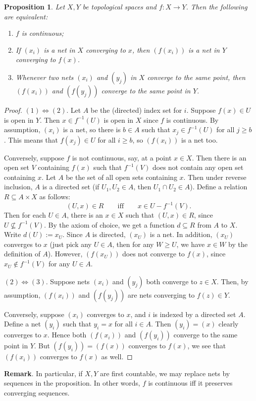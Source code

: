 \documentclass[12pt]{article}
\newtheorem{prop}{Proposition}
\begin{document}
\begin{prop}  Let $X,Y$ be topological spaces and $f:X\to Y$.  Then the following are equivalent: 
\begin{enumerate}
\item $f$ is continuous;
\item If $(x_i)$ is a net in $X$ converging to $x$, then $(f(x_i))$ is a net in $Y$ converging to $f(x)$.
\item Whenever two nets $(x_i)$ and $(y_j)$ in $X$ converge to the same point, then $(f(x_i))$ and $(f(y_j))$
converge to the same point in $Y$.
\end{enumerate}
\end{prop}
\begin{proof}
$(1)\Leftrightarrow (2)$.  Let $A$ be the (directed) index set for $i$.  Suppose $f(x)\in U$ is open in $Y$.  Then $x\in f^{-1}(U)$ is open in $X$ since $f$ is continuous.  By assumption, $(x_i)$ is a net, so there is $b \in A$ such that $x_j \in f^{-1}(U)$ for all $j\ge b$.  This means that $f(x_j)\in U$ for all $i\ge b$, so $(f(x_i))$ is a net too.

Conversely, suppose $f$ is not continuous, say, at a point $x\in X$.  Then there is an open set $V$ containing $f(x)$ such that $f^{-1}(V)$ does not contain any open set containing $x$.  Let $A$ be the set of all open sets containing $x$.  Then under reverse inclusion, $A$ is a directed set (if $U_1,U_2\in A$, then $U_1\cap U_2\in A$).  Define a relation $R\subseteq A\times X$ as follows: $$(U,x)\in R \qquad\mbox{iff}\qquad x\in U-f^{-1}(V).$$  Then for each $U\in A$, there is an $x\in X$ such that $(U,x)\in R$, since $U\not\subseteq f^{-1}(V)$.  By the axiom of choice, we get a function $d\subseteq R$ from $A$ to $X$.  Write $d(U):=x_U$.  Since $A$ is directed, $(x_U)$ is a net.  In addition, $(x_U)$ converges to $x$ (just pick any $U\in A$, then for any $W\ge U$, we have $x \in W$ by the definition of $A$).  However, $(f(x_U))$ does not converge to $f(x)$, since $x_U\notin f^{-1}(V)$ for any $U\in A$.

$(2)\Leftrightarrow (3)$.  Suppose nets $(x_i)$ and $(y_j)$ both converge to $z\in X$.  Then, by assumption, $(f(x_i))$ and $(f(y_j))$ are nets converging to $f(z)\in Y$.

Conversely, suppose $(x_i)$ converges to $x$, and $i$ is indexed by a directed set $A$.  Define a net $(y_i)$ such that $y_i=x$ for all $i\in A$.  Then $(y_i)=(x)$ clearly converges to $x$.  Hence both $(f(x_i))$ and $(f(y_i))$ converge to the same point in $Y$.  But $(f(y_i))=(f(x))$ converges to $f(x)$, we see that $(f(x_i))$ converges to $f(x)$ as well.
\end{proof}

\textbf{Remark}.  In particular, if $X,Y$ are first countable, we may replace nets by sequences in the proposition.  In other words, $f$ is continuous iff it preserves converging sequences.
\end{document}
